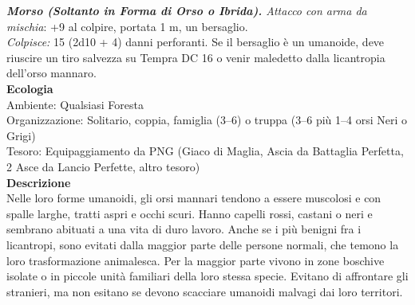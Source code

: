 \begin{multicols}{2}
\emph{\textbf{Morso (Soltanto in Forma di Orso o Ibrida).} Attacco con arma da mischia}: +9 al colpire, portata 1 m, un bersaglio.\\

\emph{Colpisce:} 15 (2d10 + 4) danni perforanti. Se il bersaglio è un umanoide, deve riuscire un tiro salvezza su Tempra DC  16 o venir maledetto dalla licantropia dell'orso mannaro.\\
\textbf{Ecologia}\\
Ambiente: Qualsiasi Foresta\\
Organizzazione: Solitario, coppia, famiglia (3–6) o truppa (3–6 più 1–4 orsi Neri o Grigi)\\
Tesoro: Equipaggiamento da PNG (Giaco di Maglia, Ascia da Battaglia Perfetta, 2 Asce da Lancio Perfette, altro tesoro)\\
\textbf{Descrizione}\\
Nelle loro forme umanoidi, gli orsi mannari tendono a essere muscolosi e con spalle larghe, tratti aspri e occhi scuri. Hanno capelli rossi, castani o neri e sembrano abituati a una vita di duro lavoro. Anche se i più benigni fra i licantropi, sono evitati dalla maggior parte delle persone normali, che temono la loro trasformazione animalesca. Per la maggior parte vivono in zone boschive isolate o in piccole unità familiari della loro stessa specie. Evitano di affrontare gli stranieri, ma non esitano se devono scacciare umanoidi malvagi dai loro territori.\\


\end{multicols}
